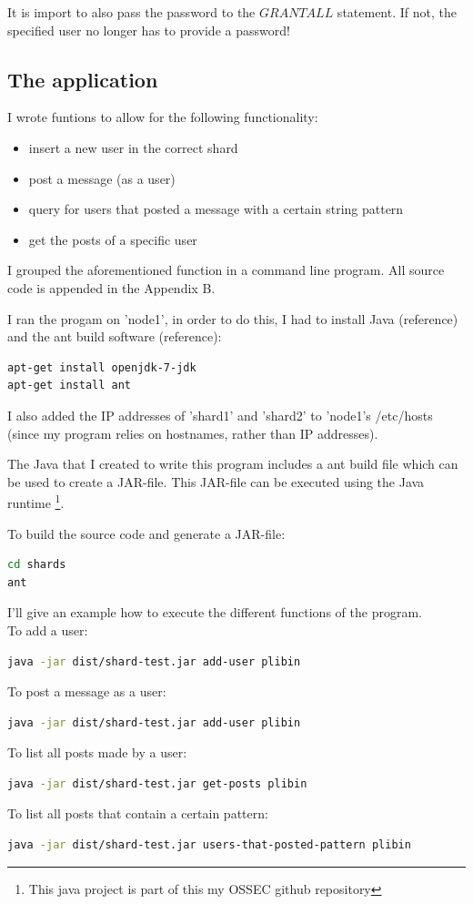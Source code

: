 \documentclass[12pt]{report}
\begin{document}
It is import to also pass the password to the $GRANT ALL$
statement. If not, the specified user no longer has to provide a
password!

\subsection{The application}
I wrote funtions to allow for the following functionality:
\begin{itemize}
\item insert a new user in the correct shard
\item post a message (as a user)
\item query for users that posted a message with a certain string
  pattern
\item get the posts of a specific user
\end{itemize}

I grouped the aforementioned function in a command line program.
All source code is appended in the Appendix B.

I ran the progam on 'node1', in order to do this, I had to install
Java (reference) and the ant build software (reference):
\begin{lstlisting}[language=bash]
apt-get install openjdk-7-jdk
apt-get install ant
\end{lstlisting}

I also added the IP addresses of 'shard1' and 'shard2' to 'node1's
/etc/hosts (since my program relies on hostnames, rather than IP
addresses).

The Java that I created to write this program includes a ant build
file which can be used to create a JAR-file. This JAR-file can be
executed using the Java runtime \footnote{This java project is part of
this my OSSEC github repository}. 

To build the source code and generate a JAR-file:
\begin{lstlisting}[language=bash]
cd shards
ant
\end{lstlisting}

I'll give an example how to execute the different functions of the
program.\\
To add a user:
\begin{lstlisting}[language=bash]
java -jar dist/shard-test.jar add-user plibin
\end{lstlisting}
To post a message as a user:
\begin{lstlisting}[language=bash]
java -jar dist/shard-test.jar add-user plibin
\end{lstlisting}
To list all posts made by a user:
\begin{lstlisting}[language=bash]
java -jar dist/shard-test.jar get-posts plibin
\end{lstlisting}
To list all posts that contain a certain pattern:
\begin{lstlisting}[language=bash]
java -jar dist/shard-test.jar users-that-posted-pattern plibin
\end{lstlisting}
\end{document}
